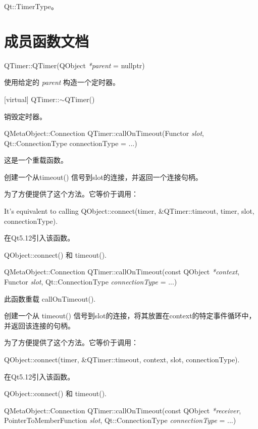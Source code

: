 \begin{seeAlso}
Qt::TimerType。
\end{seeAlso}

\section{成员函数文档}

QTimer::QTimer(QObject \emph{*parent} = nullptr)

使用给定的 \emph{parent} 构造一个定时器。

[virtual] QTimer::$\sim$QTimer()

销毁定时器。

QMetaObject::Connection QTimer::callOnTimeout(Functor \emph{slot}, Qt::ConnectionType connectionType = ...)

这是一个重载函数。

创建一个从timeout() 信号到slot的连接，并返回一个连接句柄。

为了方便提供了这个方法。它等价于调用：

\begin{cppcode}
It's equivalent to calling QObject::connect(timer, &QTimer::timeout, timer, slot, connectionType).
\end{cppcode}

在Qt5.12引入该函数。

\begin{seeAlso}
QObject::connect() 和 timeout().
\end{seeAlso}

QMetaObject::Connection QTimer::callOnTimeout(const QObject \emph{*context}, Functor \emph{slot}, Qt::ConnectionType \emph{connectionType} = ...)

此函数重载 callOnTimeout().

创建一个从 timeout() 信号到slot的连接，将其放置在context的特定事件循环中，并返回该连接的句柄。

为了方便提供了这个方法。它等价于调用：


\begin{cppcode}
QObject::connect(timer, &QTimer::timeout, context, slot, connectionType).
\end{cppcode}
	
在Qt5.12引入该函数。
	
\begin{seeAlso}
QObject::connect() 和 timeout().
\end{seeAlso}

QMetaObject::Connection QTimer::callOnTimeout(const QObject \emph{*receiver}, PointerToMemberFunction \emph{slot}, Qt::ConnectionType \emph{connectionType} = ...)

